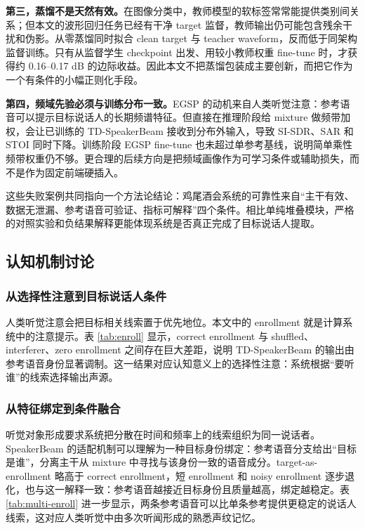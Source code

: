 \documentclass[UTF8,zihao=5,a4paper]{ctexart}
\newcommand{\sisdr}{SI-SDR}
\begin{document}
\textbf{第三，蒸馏不是天然有效。}在图像分类中，教师模型的软标签常常能提供类别间关系；但本文的波形回归任务已经有干净 target 监督，教师输出仍可能包含残余干扰和伪影。从零蒸馏同时拟合 clean target 与 teacher waveform，反而低于同架构监督训练。只有从监督学生 checkpoint 出发、用较小教师权重 fine-tune 时，才获得约 0.16--0.17 dB 的边际收益。因此本文不把蒸馏包装成主要创新，而把它作为一个有条件的小幅正则化手段。

\textbf{第四，频域先验必须与训练分布一致。}EGSP 的动机来自人类听觉注意：参考语音可以提示目标说话人的长期频谱特征。但直接在推理阶段给 mixture 做频带加权，会让已训练的 TD-SpeakerBeam 接收到分布外输入，导致 \sisdr{}、SAR 和 STOI 同时下降。训练阶段 EGSP fine-tune 也未超过单参考基线，说明简单乘性频带权重仍不够。更合理的后续方向是把频域画像作为可学习条件或辅助损失，而不是作为固定前端硬插入。

这些失败案例共同指向一个方法论结论：鸡尾酒会系统的可靠性来自“主干有效、数据无泄漏、参考语音可验证、指标可解释”四个条件。相比单纯堆叠模块，严格的对照实验和负结果解释更能体现系统是否真正完成了目标说话人提取。

\subsection{认知机制讨论}

\subsubsection{从选择性注意到目标说话人条件}

人类听觉注意会把目标相关线索置于优先地位。本文中的 enrollment 就是计算系统中的注意提示。表 \ref{tab:enroll} 显示，correct enrollment 与 shuffled、interferer、zero enrollment 之间存在巨大差距，说明 TD-SpeakerBeam 的输出由参考语音身份显著调制。这一结果对应认知意义上的选择性注意：系统根据“要听谁”的线索选择输出声源。

\subsubsection{从特征绑定到条件融合}

听觉对象形成要求系统把分散在时间和频率上的线索组织为同一说话者。SpeakerBeam 的适配机制可以理解为一种目标身份绑定：参考语音分支给出“目标是谁”，分离主干从 mixture 中寻找与该身份一致的语音成分。target-as-enrollment 略高于 correct enrollment，短 enrollment 和 noisy enrollment 逐步退化，也与这一解释一致：参考语音越接近目标身份且质量越高，绑定越稳定。表 \ref{tab:multi-enroll} 进一步显示，两条参考语音可以比单条参考提供更稳定的说话人线索，这对应人类听觉中由多次听闻形成的熟悉声纹记忆。
\end{document}
